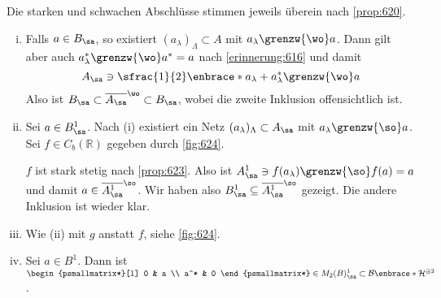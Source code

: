 \begin{beweis}
	Die starken und schwachen Abschlüsse stimmen jeweils überein nach \autoref{prop:620}.
	\begin{enumerate}[(i)]
		\item Falls $a \in B_\sa$, so existiert $(a_\lambda)_\Lambda \subset A$ mit $a_\lambda \grenzw{\wo}a$.
		 Dann gilt aber auch $a_\lambda^* \grenzw{\wo}a^*=a$ nach \autoref{erinnerung:616} und damit 
		 \[
		 	A_\sa \ni\sfrac{1}{2} \enbrace*{a_\lambda + a_\lambda^*} \grenzw{\wo} a
		 \]
		 Also ist $B_\sa \subset \overline{A_\sa}^\wo \subset B_\sa$, wobei die zweite Inklusion offensichtlich ist.
		 \item Sei $a \in B^1_\sa$. Nach (i) existiert ein Netz $(a_\lambda)_\Lambda \subset A_\sa$ mit $a_\lambda \grenzw{\so}a$.
		 Sei $f \in C_b(\mathbb{R})$ gegeben durch \cref{fig:624}.
		 \begin{figure}[bht]
		 \end{figure}
		 $f$ ist stark stetig nach \autoref{prop:623}.
		 Also ist $A_\sa^1 \ni  f(a_\lambda) \grenzw{\so} f(a)=a$ und damit $a \in \overline{A^1_\sa}^\so$.
		 Wir haben also $B^1_\sa \subseteq \overline{A^1_\sa}^\so$ gezeigt. Die andere Inklusion ist wieder klar.
		 \item Wie (ii) mit $g$ anstatt $f$, siehe \cref{fig:624}.
		 \item Sei $a \in B^1$.
		 Dann ist $\begin{psmallmatrix*}[l] 0 & a \\ a^* & 0 \end{psmallmatrix*} \in M_2(B)_\sa^1 \subset \mathcal{B} \enbrace*{\mathcal{H}^{\oplus 2}}$. 

\end{enumerate}
\end{beweis}
